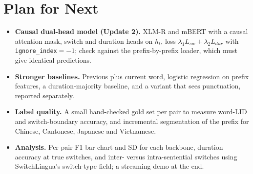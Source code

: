\documentclass[sigconf]{acmart}
\begin{document}
\section{Plan for Next}
\begin{itemize}
\item \textbf{Causal dual-head model (Update 2).} XLM-R and mBERT with a causal attention mask, switch and duration
heads on $h_t$, loss $\lambda_1 L_{sw}+\lambda_2 L_{dur}$ with \texttt{ignore\_index}$=-1$; check against the
prefix-by-prefix loader, which must give identical predictions.
\item \textbf{Stronger baselines.} Previous plus current word, logistic regression on prefix features, a
duration-majority baseline, and a variant that sees punctuation, reported separately.
\item \textbf{Label quality.} A small hand-checked gold set per pair to measure word-LID and switch-boundary
accuracy, and incremental segmentation of the prefix for Chinese, Cantonese, Japanese and Vietnamese.
\item \textbf{Analysis.} Per-pair F1 bar chart and SD for each backbone, duration accuracy at true switches, and
inter- versus intra-sentential switches using SwitchLingua's switch-type field; a streaming demo at the end.
\end{itemize}



\end{document}
